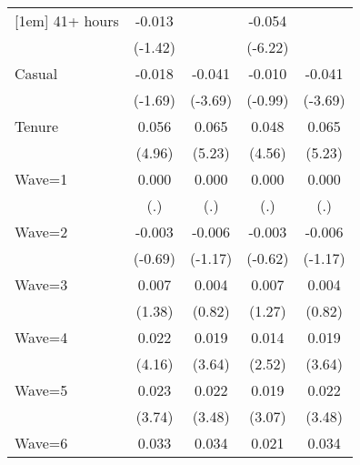 {\begin{tabular}{l*{4}{c}}
[1em]
41+ hours           &      -0.013         &                     &      -0.054\sym{***}&                     \\
                    &     (-1.42)         &                     &     (-6.22)         &                     \\
[1em]
Casual              &      -0.018         &      -0.041\sym{***}&      -0.010         &      -0.041\sym{***}\\
                    &     (-1.69)         &     (-3.69)         &     (-0.99)         &     (-3.69)         \\
[1em]
Tenure              &       0.056\sym{***}&       0.065\sym{***}&       0.048\sym{***}&       0.065\sym{***}\\
                    &      (4.96)         &      (5.23)         &      (4.56)         &      (5.23)         \\
[1em]
Wave=1              &       0.000         &       0.000         &       0.000         &       0.000         \\
                    &         (.)         &         (.)         &         (.)         &         (.)         \\
[1em]
Wave=2              &      -0.003         &      -0.006         &      -0.003         &      -0.006         \\
                    &     (-0.69)         &     (-1.17)         &     (-0.62)         &     (-1.17)         \\
[1em]
Wave=3              &       0.007         &       0.004         &       0.007         &       0.004         \\
                    &      (1.38)         &      (0.82)         &      (1.27)         &      (0.82)         \\
[1em]
Wave=4              &       0.022\sym{***}&       0.019\sym{***}&       0.014\sym{*}  &       0.019\sym{***}\\
                    &      (4.16)         &      (3.64)         &      (2.52)         &      (3.64)         \\
[1em]
Wave=5              &       0.023\sym{***}&       0.022\sym{***}&       0.019\sym{**} &       0.022\sym{***}\\
                    &      (3.74)         &      (3.48)         &      (3.07)         &      (3.48)         \\
[1em]
Wave=6              &       0.033\sym{***}&       0.034\sym{***}&       0.021\sym{**} &       0.034\sym{***}\\

\end{tabular}}
